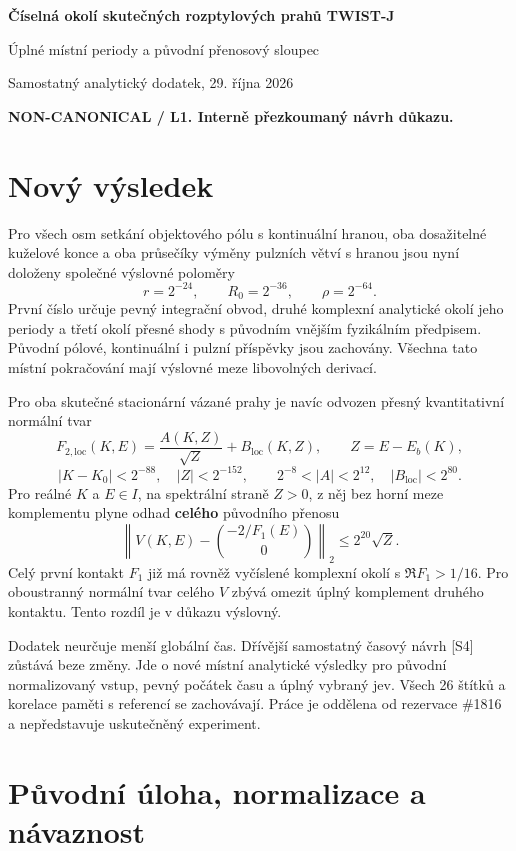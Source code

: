 \documentclass[11pt,a4paper]{article}
\theoremstyle{remark}\newtheorem{remark}[theorem]{Poznámka}
\numberwithin{equation}{section}
\begin{document}
\thispagestyle{empty}
{\Large\sffamily\bfseries Číselná okolí skutečných rozptylových prahů TWIST-J\par}
\vspace{3mm}
{\large Úplné místní periody a původní přenosový sloupec\par}
\vspace{4mm}
Samostatný analytický dodatek, 29. října 2026\par
\textbf{NON-CANONICAL / L1. Interně přezkoumaný návrh důkazu.}

\section*{Nový výsledek}

Pro všech osm setkání objektového pólu s kontinuální hranou,
oba dosažitelné kuželové konce a oba průsečíky výměny pulzních
větví s hranou jsou nyní doloženy společné výslovné poloměry
\[
\boxed{r=2^{-24},\qquad R_0=2^{-36},\qquad \rho=2^{-64}.}
\]
První číslo určuje pevný integrační obvod, druhé komplexní
analytické okolí jeho periody a třetí okolí přesné shody
s původním vnějším fyzikálním předpisem. Původní pólové,
kontinuální i pulzní příspěvky jsou zachovány. Všechna tato
místní pokračování mají výslovné meze libovolných derivací.

Pro oba skutečné stacionární vázané prahy je navíc odvozen
přesný kvantitativní normální tvar
\[
\boxed{F_{2,\mathrm{loc}}(K,E)
=\frac{A(K,Z)}{\sqrt Z}+B_{\mathrm{loc}}(K,Z),
\qquad Z=E-E_b(K),}
\]
\[
|K-K_0|<2^{-88},\quad |Z|<2^{-152},\qquad
2^{-8}<|A|<2^{12},\quad |B_{\mathrm{loc}}|<2^{80}.
\]
Pro reálné \(K\) a \(E\in I\), na spektrální straně \(Z>0\), z něj bez horní meze
komplementu plyne odhad \textbf{celého} původního přenosu
\[
\boxed{\left\|V(K,E)-\binom{-2/F_1(E)}0\right\|_2
\le 2^{20}\sqrt Z.}
\]
Celý první kontakt \(F_1\) již má rovněž vyčíslené komplexní
okolí s \(\Re F_1>1/16\). Pro oboustranný normální tvar
celého \(V\) zbývá omezit úplný komplement druhého kontaktu.
Tento rozdíl je v důkazu výslovný.

\vfill
\small
Dodatek neurčuje menší globální čas. Dřívější samostatný
časový návrh [S4] zůstává beze změny. Jde o nové místní
analytické výsledky pro původní normalizovaný vstup, pevný
počátek času a úplný vybraný jev. Všech 26 štítků a korelace
paměti s referencí se zachovávají. Práce je oddělena od
rezervace \#1816 a nepředstavuje uskutečněný experiment.
\newpage
\normalsize


\section{Původní úloha, normalizace a návaznost}
\end{document}

